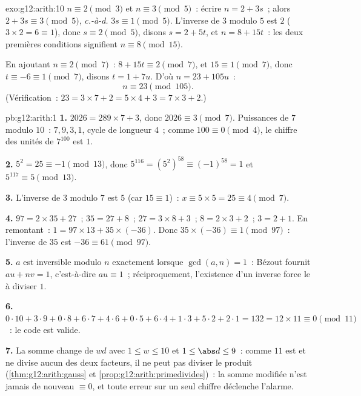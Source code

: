 \begin{solution}{exo:g12:arith:10}
$n \equiv 2 \pmod 3$ et $n \equiv 3 \pmod 5$~: écrire $n = 2 + 3s$~; alors
$2 + 3s \equiv 3 \pmod 5$, \emph{c.-à-d.} $3s \equiv 1 \pmod 5$.
L'inverse de $3$ modulo $5$ est $2$ ($3\times2 = 6 \equiv 1$), donc
$s \equiv 2 \pmod 5$, disons $s = 2 + 5t$, et $n = 8 + 15t$~: les deux
premières conditions signifient $n \equiv 8 \pmod{15}$.

En ajoutant $n \equiv 2 \pmod 7$~: $8 + 15t \equiv 2 \pmod 7$, et
$15 \equiv 1 \pmod 7$, donc $t \equiv -6 \equiv 1 \pmod 7$, disons
$t = 1 + 7u$. D'où $n = 23 + 105u$~:
\[
n \equiv 23 \pmod{105}.
\]
(Vérification~: $23 = 3\times7 + 2 = 5\times4 + 3 = 7\times3 + 2$.)
\end{solution}

\begin{solution}{pb:g12:arith:1}
\textbf{1.} $2026 = 289 \times 7 + 3$, donc $2026 \equiv 3
\pmod 7$. Puissances de $7$ modulo $10$~: $7, 9, 3, 1$, cycle de
longueur $4$~; comme $100 \equiv 0 \pmod 4$, le chiffre des unités
de $7^{100}$ est $1$.

\textbf{2.} $5^2 = 25 \equiv -1 \pmod{13}$, donc
$5^{116} = \left(5^2\right)^{58} \equiv (-1)^{58} = 1$ et
$5^{117} \equiv 5 \pmod{13}$.

\textbf{3.} L'inverse de $3$ modulo $7$ est $5$ (car
$15 \equiv 1$)~: $x \equiv 5 \times 5 = 25 \equiv 4 \pmod 7$.

\textbf{4.} $97 = 2 \times 35 + 27$~; $35 = 27 + 8$~;
$27 = 3 \times 8 + 3$~; $8 = 2 \times 3 + 2$~; $3 = 2 + 1$. En
remontant~: $1 = 97 \times 13 + 35 \times (-36)$. Donc
$35 \times (-36) \equiv 1 \pmod{97}$~: l'inverse de $35$ est
$-36 \equiv 61 \pmod{97}$.

\textbf{5.} $a$ est inversible modulo $n$ exactement lorsque
$\gcd(a, n) = 1$~: Bézout fournit $au + nv = 1$, c'est-à-dire
$au \equiv 1$~; réciproquement, l'existence d'un inverse force le
 à diviser $1$.

\textbf{6.} $0{\cdot}10 + 3{\cdot}9 + 0{\cdot}8 + 6{\cdot}7 +
4{\cdot}6 + 0{\cdot}5 + 6{\cdot}4 + 1{\cdot}3 + 5{\cdot}2 +
2{\cdot}1 = 132 = 12 \times 11 \equiv 0 \pmod{11}$~: le code est
valide.

\textbf{7.} La somme change de $wd$ avec $1 \leq w \leq 10$ et
$1 \leq \abs d \leq 9$~: comme $11$ est  et ne divise aucun
des deux facteurs, il ne peut pas diviser le produit
(\cref{thm:g12:arith:gauss} et
\cref{prop:g12:arith:primedivides})~: la somme modifiée n'est
jamais de nouveau $\equiv 0$, et toute erreur sur un seul chiffre
déclenche l'alarme.


\end{solution}
